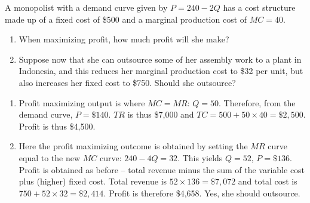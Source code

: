 \begin{enumialphparenastyle}
\begin{ex}\label{ex:ch10ex9}
A monopolist with a demand curve given by $P=240-2Q$ has a cost structure made up of a fixed cost of \$500 and a marginal production cost of $MC=40$.
\begin{enumerate}
	\item	When maximizing profit, how much profit will she make?
	\item	Suppose now that she can outsource some of her assembly work to a plant in Indonesia, and this reduces her marginal production cost to \$32 per unit, but also increases her fixed cost to \$750. Should she outsource?
\end{enumerate}
\begin{sol}
\begin{enumerate}
	\item	Profit maximizing output is where $MC=MR$: $Q=50$. Therefore, from the demand curve, $P=\$140$. $TR$ is thus \$7,000 and $TC=500+50\times 40=\$2,500$. Profit is thus \$4,500.
	\item	Here the profit maximizing outcome is obtained by setting the $MR$ curve equal to the new $MC$ curve: $240-4Q=32$. This yields $Q=52$, $P=\$136$. Profit is obtained as before -- total revenue minus the sum of the variable cost plus (higher) fixed cost. Total revenue is $52\times 136=\$7,072$ and total cost is $750+52\times 32=\$2,414$. Profit is therefore \$4,658. Yes, she should outsource.
\end{enumerate}
\begin{center}
\end{center}
\end{sol}
\end{ex}


\end{enumialphparenastyle}
